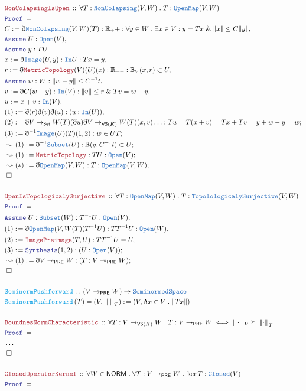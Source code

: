 \documentclass[12pt]{scrartcl}
\newcommand{\TYPE}[1]{\textcolor{NavyBlue}{\mathtt{#1}}}
\newcommand{\FUNC}[1]{\textcolor{Cerulean}{\mathtt{#1}}}
\newcommand{\LOGIC}[1]{\textcolor{Blue}{\mathtt{#1}}}
\newcommand{\THM}[1]{\textcolor{Maroon}{\mathtt{#1}}}
\renewcommand{\.}{\; . \;}
\newcommand{\de}{: \kern 0.1pc =}
\newcommand{\Act}[1]{\left( #1 \right)}
\newcommand{\Theorem}[2]{& \THM{#1} \, :: \, #2 \\ & \Proof = \\ }
\newcommand{\DeclareFunc}[2]{& \FUNC{#1} \, :: \, #2 \\}
\newcommand{\DefineNamedFunc}[4]{&  \FUNC{#1}\Act{#2} = #3 \de #4 \\}
\newcommand{\Page}[1]{\begin{align*} #1 \end{align*} \newpage   }
\newcommand{ \bd }{ \ByDef }
\newcommand{\NoProof}{ & \ldots \\ \EndProof}
\renewcommand{\And}{\; \& \;}
\newcommand{\Reals}{\mathbb{R} }
\newcommand{\ToSurj}{\twoheadrightarrow}
\newcommand{\Say}[3]{& #1 \de #2 : #3, \\}
\newcommand{\Conclude}[3]{& #1 \de #2 : #3; \\}
\newcommand{\DeriveConclude}[3]{& \leadsto #1 \de #2 : #3 ; \\}
\newcommand{\A}{\LOGIC{Assume} \;}
\newcommand{\Assume}[2]{& \A #1 : #2, \\}
\newcommand{\QED}{\; \square}
\newcommand{\EndProof}{& \QED \\}
\newcommand{\ByDef}{\eth}
\newcommand{\Proof}{\LOGIC{Proof} \; }
\newcommand{\SNS}{\TYPE{SeminormedSpace}} %
\newcommand{\PRE}{\mathsf{PRE}} %
\newcommand{\NORM}{\mathsf{NORM}} %
\newcommand{\vertiii}[1]{{\left\vert\kern-0.25ex\left\vert\kern-0.25ex\left\vert #1 \right\vert\kern-0.25ex\right\vert\kern-0.25ex\right\vert}} %
\begin{document}
   \Page{
 \Theorem{NonColapsingIsOpen}{ \forall T : \TYPE{NonColapsing}(V,W) \. T : \TYPE{OpenMap}(V,W) }
 \Say{C}{\bd \TYPE{NonColapsing}(V,W)(T)}{\Reals_++ : \forall y \in W \. \exists x \in V 
  : y = Tx \And \|x\| \le C\|y\| } 
 \Assume{U}{\TYPE{Open}(V)}  
 \Assume{y}{TU}
 \Say{x}{\bd \TYPE{Image}(U,y)}{\TYPE{In}U : Tx = y}
 \Say{r}{\bd \THM{MetricTopology}(V)(U)(x)}{\Reals_{++} : \mathbb{B}_{V}(x,r) \subset U}
 \Assume{w}{W : \| w - y \| \le C^{-1}t }
 \Say{v}{\bd C (w - y)}{\TYPE{In}(V) : \| v \| \le r \And Tv = w - y }
 \Say{u}{ x + v }{\TYPE{In}(V)}
 \Say{(1)}{ \bd(r)\bd(v)\bd(u)  }{ ( u : \TYPE{In}(U))}
 \Conclude{(2)}{ \bd V \to_{\mathsf{Set}} W(T) (\bd u)  \bd V \to_{\mathsf{VS}(K)} W
  (T)( x, v) \ldots 
 }{ Tu = T(x + v) = Tx + Tv = y + w - y = w }
 \Conclude{(3)}{ \bd^{-1} \TYPE{Image}(U)(T)(1,2) }{ w \in UT}
 \DeriveConclude{(1)}{ \bd^{-1} \TYPE{Subset}(U) }{ \mathbb{B}(y, C^{-1}t) \subset U }
 \DeriveConclude{(1)}{ \THM{MetricTopology}}{TU : \TYPE{Open}(V)}
 \DeriveConclude{(*)}{ \bd \TYPE{OpenMap}(V,W)}{T : \TYPE{OpenMap}(V,W)}
 \EndProof
 \\
 \Theorem{OpenIsTopologicalySurjective}{ \forall T : \TYPE{OpenMap}(V,W) \. 
 T :  \TYPE{TopolologicalySurjective}(V, W)}
 \Assume{U}{\TYPE{Subset}(W) : T^{-1}U : \TYPE{Open}(V)}
 \Say{(1)}{\bd \TYPE{OpenMap}(V,W(T)(T^{-1}U)}{TT^{-1}U : \TYPE{Open}(W)}
 \Say{(2)}{\THM{ImagePreimage}(T,U)}{ TT^{-1}U = U }
 \Conclude{(3)}{\LOGIC{Synthesis}(1,2)}{(U :\TYPE{Open}(V))}
 \DeriveConclude{(1)}{\bd V \ToSurj_\PRE W}{(T : V \ToSurj_\PRE W)}
 \EndProof
 \\
 \DeclareFunc{SeminormPushforward}{  (V \to_{\PRE} W) \to \SNS }
 \DefineNamedFunc{SeminormPushforward}{T}{(V, \vertiii{\cdot}_T)}
 {(V,\Lambda x \in V \. \| Tx \|)}
 \\
 \Theorem{BoundnesNormCharacteristic}{\forall T : V \to_{\mathsf{VS}(K)} W \.  
 T : V \to_{\PRE} W \iff \| \cdot \|_V \succeq \vertiii{\cdot}_T 
 }
 \NoProof
 \\
 \Theorem{ClosedOperatorKernel}{ \forall W \in \NORM \. \forall T : V \to_\PRE W \. \ker T : \TYPE{Closed}(V)}
 }
\end{document}
